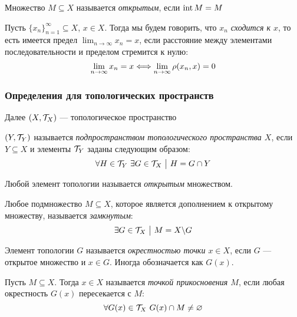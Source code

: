 \begin{definition}
	Множество $M \subseteq X$ называется \textit{открытым}, если $\operatorname{int} M = M$
\end{definition}

\begin{definition}
	Пусть $\{x_n\}_{n = 1}^\infty \subseteq X$, $x \in X$. Тогда мы будем говорить, что \textit{$x_n$ сходится к $x$}, то есть имеется предел $\lim_{n \to \infty} x_n = x$, если расстояние между элементами последовательности и пределом стремится к нулю:
	\[
		\lim_{n \to \infty} x_n = x \Longleftrightarrow \lim_{n \to \infty} \rho(x_n, x) = 0
	\]
\end{definition}

\subsubsection*{Определения для топологических пространств}

\begin{note}
	Далее $(X, \mathcal{T}_X)$ --- топологическое пространство
\end{note}

\begin{definition}
	$(Y, \mathcal{T}_Y)$ называется \textit{подпространством топологического пространства $X$}, если $Y \subseteq X$ и элементы $\mathcal{T}_Y$ заданы следующим образом:
	\[
		\forall H \in \mathcal{T}_Y\ \exists G \in \mathcal{T}_X \ \big|\  H = G \cap Y
	\]
\end{definition}

\begin{definition}
	Любой элемент топологии называется \textit{открытым} множеством.
\end{definition}

\begin{definition}
	Любое подмножество $M \subseteq X$, которое является дополнением к открытому множеству, называется \textit{замкнутым}:
	\[
		\exists G \in \mathcal{T}_X \ \big|\  M = X \backslash G
	\]
\end{definition}

\begin{definition}
	Элемент топологии $G$ называется \textit{окрестностью точки $x \in X$}, если $G$ --- открытое множество и $x \in G$. Иногда обозначается как $G(x)$.
\end{definition}

\begin{definition}
	Пусть $M \subseteq X$. Тогда $x \in X$ называется \textit{точкой прикосновения $M$}, если любая окрестность $G(x)$ пересекается с $M$:
	\[
		\forall G(x) \in \mathcal{T}_X\ G(x) \cap M \neq \varnothing
	\]
\end{definition}

